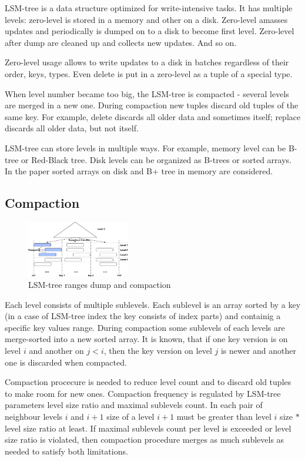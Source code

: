\documentclass{vldb}
\begin{document}
LSM-tree is a data structure optimized for write-intensive tasks. It has
multiple levels: zero-level is stored in a memory and other on a disk.
Zero-level amasses updates and periodically is dumped on to a disk to become
first level. Zero-level after dump are cleaned up and collects new updates. And
so on.

Zero-level usage allows to write updates to a disk in batches regardless of
their order, keys, types. Even delete is put in a zero-level as a tuple of a
special type.

When level number became too big, the LSM-tree is compacted - several levels are
merged in a new one. During compaction new tuples discard old tuples of the same
key. For example, delete discards all older data and sometimes itself; replace
discards all older data, but not itself.

LSM-tree can store levels in multiple ways. For example, memory level can be
B-tree or Red-Black tree. Disk levels can be organized as B-trees or sorted
arrays. In the paper sorted arrays on disk and B+ tree in memory are considered.

\subsection{Compaction}
\begin{figure}
\centering
\includegraphics[width=0.4\textwidth]{compaction_schema}
\caption{LSM-tree ranges dump and compaction}
\label{fig:compaction_schema}
\end{figure}
Each level consists of multiple sublevels. Each sublevel is an array sorted by
a key (in a case of LSM-tree index the key consists of index parts) and
containig a specific key values range. During compaction some sublevels of each
levels are merge-sorted into a new sorted array. It is known, that if one key
version is on level $i$ and another on $j < i$, then the key version on level
$j$ is newer and another one is discarded when compacted.

Compaction procecure is needed to reduce level count and to discard old tuples
to make room for new ones. Compaction frequency is regulated by LSM-tree
parameters level size ratio and maximal sublevels count. In each pair of
neighbour levels $i$ and $i + 1$ size of a level $i + 1$ must be greater than
level $i$ size $*$ level size ratio at least. If maximal sublevels count per
level is exceeded or level size ratio is violated, then compaction procedure
merges as much sublevels as needed to satisfy both limitations.
\end{document}
